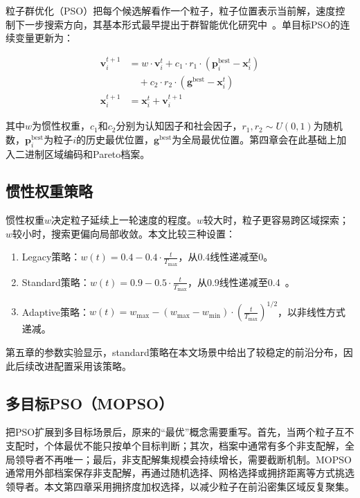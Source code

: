 粒子群优化（PSO）把每个候选解看作一个粒子，粒子位置表示当前解，速度控制下一步搜索方向，其基本形式最早提出于群智能优化研究中~\cite{Kennedy1995}。单目标PSO的连续变量更新为：

\begin{align}
\mathbf{v}_i^{t+1}
&= w \cdot \mathbf{v}_i^t
 + c_1 \cdot r_1 \cdot (\mathbf{p}_i^{\text{best}} - \mathbf{x}_i^t) \nonumber\\
&\quad + c_2 \cdot r_2 \cdot (\mathbf{g}^{\text{best}} - \mathbf{x}_i^t) \label{eq:pso_velocity} \\
\mathbf{x}_i^{t+1}
&= \mathbf{x}_i^t + \mathbf{v}_i^{t+1} \label{eq:pso_position}
\end{align}

其中$w$为惯性权重，$c_1$和$c_2$分别为认知因子和社会因子，$r_1,r_2\sim U(0,1)$为随机数，$\mathbf{p}_i^{\text{best}}$为粒子$i$的历史最优位置，$\mathbf{g}^{\text{best}}$为全局最优位置。第四章会在此基础上加入二进制区域编码和Pareto档案。

\subsection{惯性权重策略}

惯性权重$w$决定粒子延续上一轮速度的程度。$w$较大时，粒子更容易跨区域探索；$w$较小时，搜索更偏向局部收敛。本文比较三种设置：

\begin{enumerate}
    \item Legacy策略：$w(t) = 0.4 - 0.4 \cdot \frac{t}{T_{\max}}$，从0.4线性递减至0。
    \item Standard策略：$w(t) = 0.9 - 0.5 \cdot \frac{t}{T_{\max}}$，从0.9线性递减至0.4~\cite{Shi1998}。
    \item Adaptive策略：$w(t) = w_{\max} - (w_{\max} - w_{\min}) \cdot \left(\frac{t}{T_{\max}}\right)^{1/2}$，以非线性方式递减。
\end{enumerate}

第五章的参数实验显示，standard策略在本文场景中给出了较稳定的前沿分布，因此后续改进配置采用该策略。

\subsection{多目标PSO（MOPSO）}

把PSO扩展到多目标场景后，原来的“最优”概念需要重写。首先，当两个粒子互不支配时，个体最优不能只按单个目标判断；其次，档案中通常有多个非支配解，全局领导者不再唯一；最后，非支配解集规模会持续增长，需要截断机制。MOPSO通常用外部档案保存非支配解，再通过随机选择、网格选择或拥挤距离等方式挑选领导者。本文第四章采用拥挤度加权选择，以减少粒子在前沿密集区域反复聚集。

